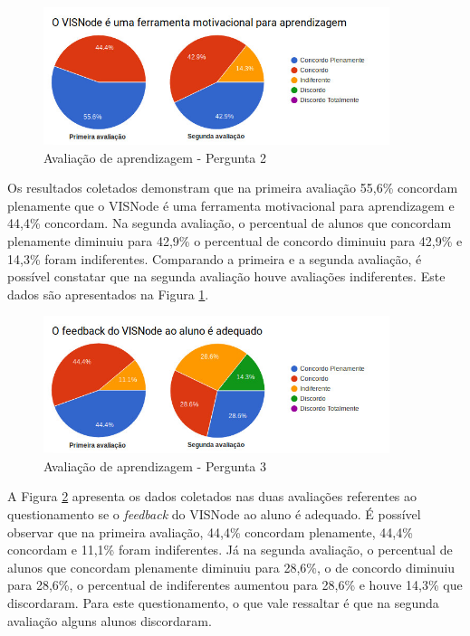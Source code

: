 \documentclass[
	12pt,				%
	oneside,			%
	a4paper,			%
	english,			%
	french,				%
	spanish,			%
	brazil,				%
	]{abntex2}
\begin{document}
\begin{figure}[H]
\centering
\caption{Avaliação de aprendizagem - Pergunta 2}\label{fig:avaliacaoAprendizagem2}
\includegraphics[width=0.9\textwidth]{imagens/avaliacoes/aprendizagem_2.jpg}
\sourceAuthor
\end{figure}

Os resultados coletados demonstram que na primeira avaliação 55,6\% concordam plenamente que o VISNode é uma ferramenta motivacional para aprendizagem e 44,4\% concordam. Na segunda avaliação, o percentual de alunos que concordam plenamente diminuiu para 42,9\% o percentual de concordo diminuiu para 42,9\% e 14,3\% foram indiferentes. Comparando a primeira e a segunda avaliação, é possível constatar que na segunda avaliação houve avaliações indiferentes. Este dados são apresentados na Figura \ref{fig:avaliacaoAprendizagem2}.

\begin{figure}[H]
\centering
\caption{Avaliação de aprendizagem - Pergunta 3}\label{fig:avaliacaoAprendizagem3}
\includegraphics[width=0.9\textwidth]{imagens/avaliacoes/aprendizagem_3.jpg}
\sourceAuthor
\end{figure}

A Figura \ref{fig:avaliacaoAprendizagem3} apresenta os dados coletados nas duas avaliações referentes ao questionamento se o \textit{feedback} do VISNode ao aluno é adequado. É possível observar que na primeira avaliação, 44,4\% concordam plenamente, 44,4\% concordam e 11,1\% foram indiferentes. Já na segunda avaliação, o percentual de alunos que concordam plenamente diminuiu para 28,6\%, o de concordo diminuiu para 28,6\%, o percentual de indiferentes aumentou para 28,6\% e houve 14,3\% que discordaram. Para este questionamento, o que vale ressaltar é que na segunda avaliação alguns alunos discordaram.
\end{document}
